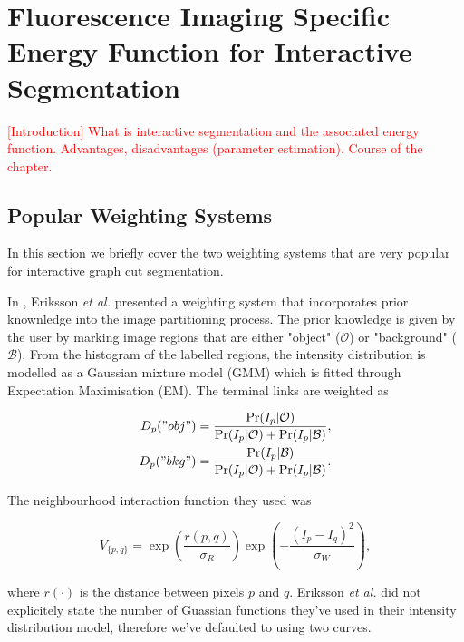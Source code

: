 
\chapter{Fluorescence Imaging Specific Energy Function for Interactive Segmentation} %

\label{chap:Chapter6} %

\textcolor{red}{[Introduction] What is interactive segmentation and the associated energy function. Advantages, disadvantages (parameter estimation). Course of the chapter.}


\section{Popular Weighting Systems}
\label{sec:interactivepopularweighting}

In this section we briefly cover the two weighting systems that are very popular for interactive graph cut segmentation.

\begin{definition} In \citep{Eriksson2006}, Eriksson \textit{et al.} presented a weighting system that incorporates prior knownledge into the image partitioning process. The prior knowledge is given by the user by marking image regions that are either "object" ($\mathcal{O}$) or "background" ($\mathcal{B}$). From the histogram of the labelled regions, the intensity distribution is modelled as a Gaussian mixture model (GMM) which is fitted through Expectation Maximisation (EM). The terminal links are weighted as
	
\begin{align}
	D_p("obj") &= \frac{\Pr(I_p|\mathcal{O})}{\Pr(I_p|\mathcal{O})+\Pr(I_p|\mathcal{B})}, \\
	D_p("bkg") &= \frac{\Pr(I_p|\mathcal{B})}{\Pr(I_p|\mathcal{O})+\Pr(I_p|\mathcal{B})}.
\end{align}

The neighbourhood interaction function they used was
	
\begin{equation}
	V_{\{p,q\}} = \exp\left( \frac{r(p,q)}{\sigma_R} \right)\exp\left( -\frac{(I_p-I_q)^2}{\sigma_W} \right),
\end{equation}
	
where $r(\cdot)$ is the distance between pixels $p$ and $q$. Eriksson \textit{et al.} did not explicitely state the number of Guassian functions they've used in their intensity distribution model, therefore we've defaulted to using two curves.
	
\end{definition}

